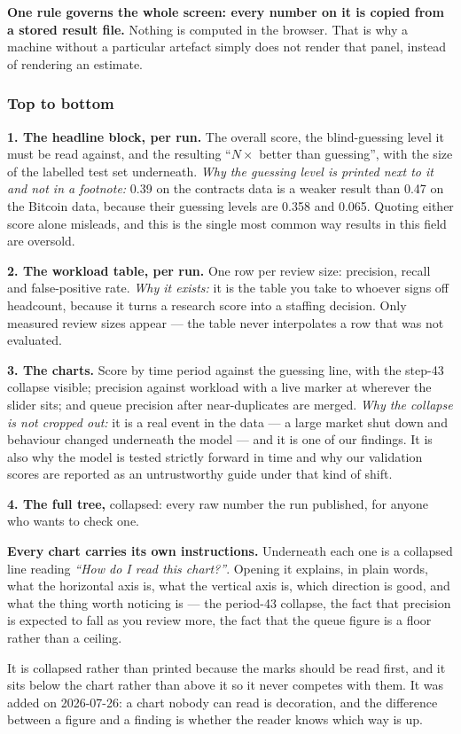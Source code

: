 \documentclass[11pt,a4paper]{article}
\begin{document}
\textbf{One rule governs the whole screen: every number on it is copied from a
stored result file.} Nothing is computed in the browser. That is why a machine
without a particular artefact simply does not render that panel, instead of
rendering an estimate.

\subsubsection*{Top to bottom}

\textbf{1. The headline block, per run.} The overall score, the blind-guessing
level it must be read against, and the resulting ``$N\times$ better than
guessing'', with the size of the labelled test set underneath. \emph{Why the
guessing level is printed next to it and not in a footnote:} 0.39 on the
contracts data is a weaker result than 0.47 on the Bitcoin data, because their
guessing levels are 0.358 and 0.065. Quoting either score alone misleads, and
this is the single most common way results in this field are oversold.

\textbf{2. The workload table, per run.} One row per review size: precision,
recall and false-positive rate. \emph{Why it exists:} it is the table you take
to whoever signs off headcount, because it turns a research score into a
staffing decision. Only measured review sizes appear --- the table never
interpolates a row that was not evaluated.

\textbf{3. The charts.} Score by time period against the guessing line, with the
step-43 collapse visible; precision against workload with a live marker at
wherever the slider sits; and queue precision after near-duplicates are merged.
\emph{Why the collapse is not cropped out:} it is a real event in the data --- a
large market shut down and behaviour changed underneath the model --- and it is
one of our findings. It is also why the model is tested strictly forward in
time and why our validation scores are reported as an untrustworthy guide under
that kind of shift.

\textbf{4. The full tree,} collapsed: every raw number the run published, for
anyone who wants to check one.

\begin{plain}
\textbf{Every chart carries its own instructions.} Underneath each one is a
collapsed line reading \emph{``How do I read this chart?''}. Opening it explains,
in plain words, what the horizontal axis is, what the vertical axis is, which
direction is good, and what the thing worth noticing is --- the period-43
collapse, the fact that precision is expected to fall as you review more, the
fact that the queue figure is a floor rather than a ceiling.

It is collapsed rather than printed because the marks should be read first, and
it sits below the chart rather than above it so it never competes with them. It
was added on 2026-07-26: a chart nobody can read is decoration, and the
difference between a figure and a finding is whether the reader knows which way
is up.
\end{plain}
\end{document}
